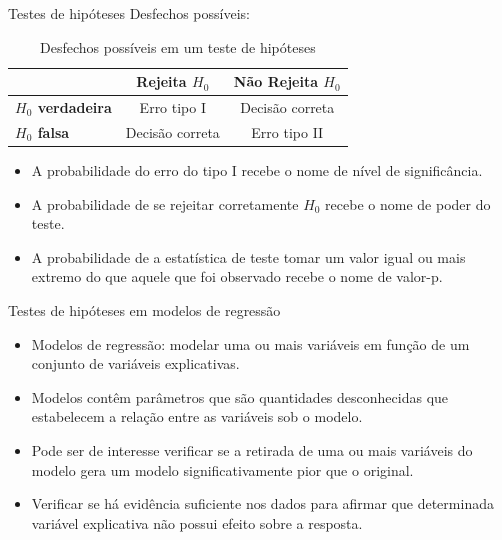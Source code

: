 \documentclass[
  ignorenonframetext,
  serif,
  professionalfont,
  usenames,
  dvipsnames,
  aspectratio = 169]{beamer}
\begin{document}
\begin{frame}{Testes de hipóteses}
\protect\hypertarget{testes-de-hipuxf3teses-3}{}
Desfechos possíveis:

\begin{table}[]
\begin{tabular}{l|cc}
\hline
\multicolumn{1}{c|}{}    & \textbf{Rejeita $H_0$} & \textbf{Não Rejeita $H_0$} \\ \hline
\textbf{$H_0$ verdadeira} & Erro tipo I           & Decisão correta           \\
\textbf{$H_0$ falsa}      & Decisão correta       & Erro tipo II              \\ \hline
\end{tabular}
\caption{Desfechos possíveis em um teste de hipóteses}
\label{tab:my-table}
\end{table}

\begin{itemize}
    \itemsep 2ex
  
  \item A probabilidade do erro do tipo I recebe o nome de nível de significância.
  
  \item A probabilidade de se rejeitar corretamente $H_0$ recebe o nome de poder do teste.
  
  \item A probabilidade de a estatística de teste tomar um valor igual ou mais extremo do que aquele que foi observado recebe o nome de valor-p.
    
  \end{itemize}
\end{frame}

\begin{frame}{Testes de hipóteses em modelos de regressão}
\protect\hypertarget{testes-de-hipuxf3teses-em-modelos-de-regressuxe3o-4}{}
\begin{itemize}
  \itemsep 2ex

  \item Modelos de regressão: modelar uma ou mais variáveis em função de um conjunto de variáveis explicativas. 

  \item Modelos contêm parâmetros que são quantidades desconhecidas que estabelecem a relação entre as variáveis sob o modelo. 

  \item Pode ser de interesse verificar se a retirada de uma ou mais variáveis do modelo gera um modelo significativamente pior que o original. 

  \item Verificar se há evidência suficiente nos dados para afirmar que determinada variável explicativa não possui efeito sobre a resposta.

\end{itemize}
\end{frame}
\end{document}
